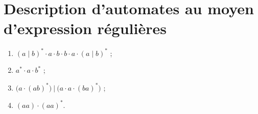 \section{Description d'automates au moyen d'expression régulières}

\begin{multicols}{2}
	\begin{enumerate}
		\item $(a  \mid b)^* \cdot a\cdot b\cdot b\cdot a\cdot (a \mid b)^*$\/ ;
		\item $a^* \cdot a \cdot b^*$\/ ;
		\item $\big(a \cdot (ab)^*\big)\:\big|\: \big(a\cdot a\cdot (ba)^*\big)$\/ ;
		\item $(aa)\cdot (aa)^*$.
	\end{enumerate}
\end{multicols}
